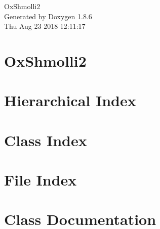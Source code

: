 \documentclass[twoside]{book}
\newcommand{\clearemptydoublepage}{%
  \newpage{\pagestyle{empty}\cleardoublepage}%
}
\begin{document}
\hypersetup{pageanchor=false}
\begin{titlepage}
\vspace*{7cm}
\begin{center}%
{\Large Ox\-Shmolli2 }\\
\vspace*{1cm}
{\large Generated by Doxygen 1.8.6}\\
\vspace*{0.5cm}
{\small Thu Aug 23 2018 12:11:17}\\
\end{center}
\end{titlepage}
\clearemptydoublepage
\tableofcontents
\clearemptydoublepage
{}
\hypersetup{pageanchor=true}

\chapter{Ox\-Shmolli2}
\label{md__r_e_a_d_m_e}
\hypertarget{md__r_e_a_d_m_e}{}

\chapter{Hierarchical Index}

\chapter{Class Index}

\chapter{File Index}

\chapter{Class Documentation}





























\end{document}
